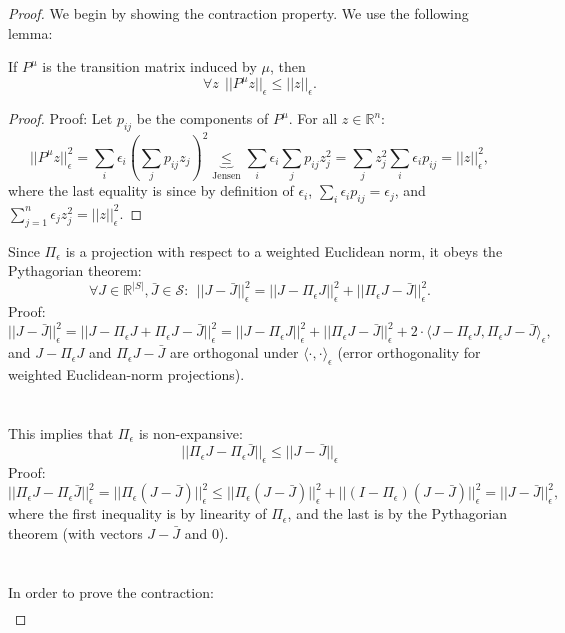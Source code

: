 \begin{proof}
We begin by showing the contraction property. We use the following lemma:
\begin{lemma}\label{lem:P_non_expansion} If $P^\mu$ is the transition matrix induced by $\mu$, then
$$\forall z \ \ ||P^\mu z||_\epsilon \le ||z||_\epsilon.$$
\end{lemma}
\begin{proof}
Proof: Let $p_{ij}$ be the components of $P^\mu$. For all $z \in \mathbb{R}^n$:
$$||P^\mu z||_\epsilon^2 = \sum_i \epsilon_i\left(\sum_j p_{ij}z_j\right)^2 \underbrace{\leq}_{\textrm{Jensen}} \sum_i \epsilon_i \sum_j p_{ij} z_j^2 =  \sum_j z_j^2 \sum_i\epsilon_i p_{ij} = ||z||_\epsilon^2,$$
where the last equality is since by definition of $\epsilon_i$, $\sum_i\epsilon_i p_{ij}  =\epsilon_j$, and
$\sum_{j=1}^n\epsilon_j z_j^2 = ||z||_\epsilon^2.$
\end{proof}
Since $\Pi_\epsilon$ is a projection with respect to a weighted Euclidean norm, it obeys the Pythagorian theorem:
$$\forall J\in \mathbb{R}^{|S|}, \bar{J}\in \mathcal{S}: \ \ ||J-\bar{J}||_\epsilon^2 = ||J-\Pi_\epsilon J||_\epsilon^2 + ||\Pi_\epsilon J - \bar{J}||_\epsilon^2.$$
Proof:
$$||J-\bar{J}||_\epsilon^2 = ||J-\Pi_\epsilon J + \Pi_\epsilon J - \bar{J}||_\epsilon^2 = ||J-\Pi_\epsilon J||_\epsilon^2 + ||\Pi_\epsilon J - \bar{J}||_\epsilon^2 + 2 \cdot \langle J-\Pi_\epsilon J, \Pi_\epsilon J - \bar{J}\rangle_\epsilon,$$
and $J-\Pi_\epsilon J$ and $\Pi_\epsilon J-\bar{J}$ are orthogonal under $\langle\cdot,\cdot\rangle_\epsilon$ (error orthogonality for weighted Euclidean-norm projections).
\\
\\
\\
This implies that $\Pi_\epsilon$ is non-expansive:
$$||\Pi_\epsilon J - \Pi_\epsilon \bar{J}||_\epsilon \le ||J-\bar{J}||_\epsilon$$
Proof:
$$||\Pi_\epsilon J - \Pi_\epsilon \bar{J}||_\epsilon^2 = ||\Pi_\epsilon(J-\bar{J})||_\epsilon^2 \le ||\Pi_\epsilon(J-\bar{J})||_\epsilon^2 + ||(I-\Pi_\epsilon)(J-\bar{J})||_\epsilon^2 = ||J-\bar{J}||_\epsilon^2,$$
where the first inequality is by linearity of $\Pi_\epsilon$, and the last is by the Pythagorian theorem (with vectors $J-\bar{J}$ and $0$).
\\
\\
\\
In order to prove the contraction:
\begin{equation*}
\begin{split}

\end{split}
\end{equation*}
\end{proof}
